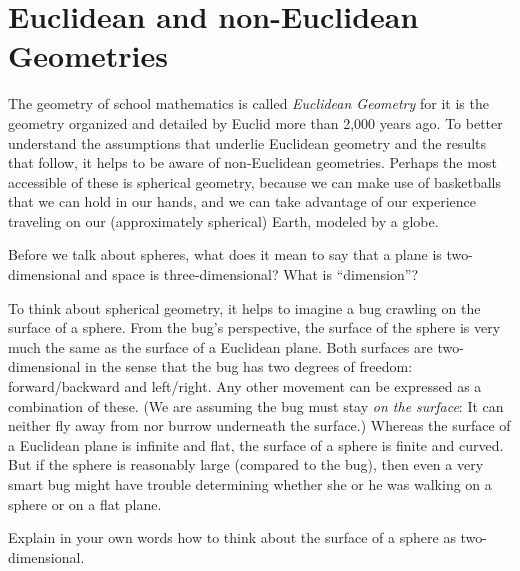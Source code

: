 \newpage 

\section{Euclidean and non-Euclidean Geometries}
The geometry of school mathematics is called \emph{Euclidean Geometry} for it is the geometry organized and detailed by Euclid more than 2,000 years ago.  To better understand the assumptions that underlie Euclidean geometry and the results that follow, it helps to be aware of non-Euclidean geometries.  Perhaps the most accessible of these is spherical geometry, because we can make use of basketballs that we can hold in our hands, and we can take advantage of our experience traveling on our (approximately spherical) Earth, modeled by a globe.  

\begin{question}
Before we talk about spheres, what does it mean to say that a plane is two-dimensional and space is three-dimensional?    What is ``dimension''?  
\end{question}
\QM

To think about spherical geometry, it helps to imagine a bug crawling on the surface of a sphere.  From the bug's perspective, the surface of the sphere is very much the same as the surface of a Euclidean plane.  Both surfaces are two-dimensional in the sense that the bug has two degrees of freedom:  forward/backward and left/right.  Any other movement can be expressed as a combination of these.  (We are assuming the bug must stay \emph{on the surface}:  It can neither fly away from nor burrow underneath the surface.)  Whereas the surface of a Euclidean plane is infinite and flat, the surface of a sphere is finite and curved.  But if the sphere is reasonably large (compared to the bug), then even a very smart bug might have trouble determining whether she or he was walking on a sphere or on a flat plane.

\begin{question}
Explain in your own words how to think about the surface of a sphere as two-dimensional.  
\end{question}
\QM

